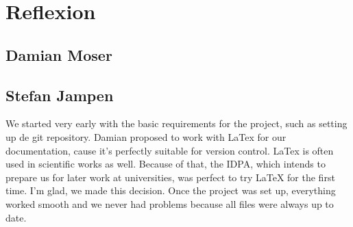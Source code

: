 \begin{dayentry}{}
\end{dayentry}

\begin{dayentry}{}
\end{dayentry}

\begin{dayentry}{}
\end{dayentry}

\begin{dayentry}{}
\end{dayentry}

\begin{dayentry}{}
\end{dayentry}

\begin{dayentry}{}
\end{dayentry}

\begin{dayentry}{}
\end{dayentry}

\section{Reflexion}
\subsection{Damian Moser}

\subsection{Stefan Jampen}
We started very early with the basic requirements for the project, such as setting up de git repository.
Damian proposed to work with LaTex for our documentation, cause it's perfectly suitable for version control. LaTex is often used in scientific works as well. Because of that, the IDPA, which intends to prepare us for later work at universities, was perfect to try LaTeX for the first time. I'm glad, we made this decision. Once the project was set up, everything worked smooth and we never had problems because all files were always up to date.\\

